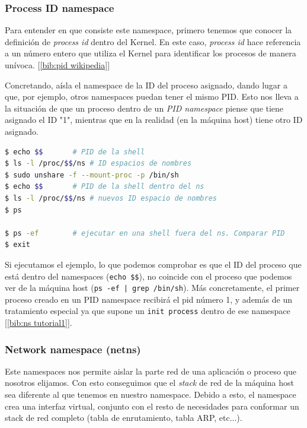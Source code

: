 \documentclass[12pt]{article}
\begin{document}
	\pagebreak
	
	\subsubsection{Process ID namespace}
	\par \noindent Para entender en que consiste este namespace, primero tenemos que conocer la definición de \textit{process id} dentro del Kernel. En este caso, \textit{process id} hace referencia a un número entero que utiliza el Kernel para identificar los procesos de manera unívoca. [\ref{bib:pid wikipedia}]\\
	
	\par \noindent Concretando, aísla el namespace de la ID del proceso asignado, dando lugar a que, por ejemplo, otros namespaces puedan tener el mismo PID. Esto nos lleva a la situación de que un proceso dentro de un \textit{PID namespace} piense que tiene asignado el ID "1", mientras que en la realidad (en la máquina host) tiene otro ID asignado.
	
	\addvspace{10px}
	
	\begin{lstlisting}[language=bash, caption=Uso de process id namespace]
$ echo $$		# PID de la shell
$ ls -l /proc/$$/ns	# ID espacios de nombres 
$ sudo unshare -f --mount-proc -p /bin/sh
$ echo $$		# PID de la shell dentro del ns
$ ls -l /proc/$$/ns	# nuevos ID espacio de nombres
$ ps

$ ps -ef 		# ejecutar en una shell fuera del ns. Comparar PID
$ exit
	\end{lstlisting}

	\addvspace{10px}
	
	\par \noindent Si ejecutamos el ejemplo, lo que podemos comprobar es que el ID del proceso que está dentro del namespaces (\texttt{echo \$\$}), no coincide con el proceso que podemos ver de la máquina host (\texttt{ps -ef | grep /bin/sh}). Más concretamente, el primer proceso creado en un PID namespace recibirá el pid número 1, y además de un tratamiento especial ya que supone  un \texttt{init process} dentro de ese namespace [\ref{bib:ns tutorial1}].
	
	
	\pagebreak
	
	\subsubsection{Network namespace (netns)}
	\par \noindent Este namespaces nos permite aislar la parte red de una aplicación o proceso que nosotros elijamos. Con esto conseguimos que el \textit{stack} de red de la máquina host sea diferente al que tenemos en nuestro namespace. Debido a esto, el namespace crea una interfaz virtual, conjunto con el resto de necesidades para conformar un stack de red completo (tabla de enrutamiento, tabla ARP, etc...).\\
	
\end{document}

